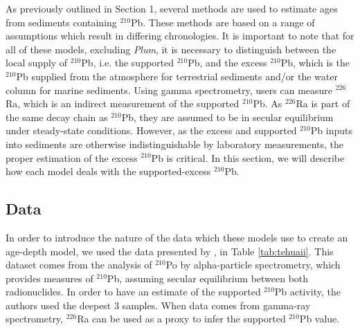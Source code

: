 \documentclass [10pt] {article}
\begin{document}
As previously outlined in Section 1, several methods are used to estimate ages from sediments containing $^{210}$Pb. 
These methods are based on a range of assumptions which result in differing chronologies. 
It is important to note that for all of these models, excluding \textit{Plum}, it is necessary to distinguish between the local supply of $^{210}$Pb, i.e. the supported $^{210}$Pb, and the excess $^{210}$Pb, which is the $^{210}$Pb supplied from the atmosphere for terrestrial sediments and/or the water column for marine sediments.
Using gamma spectrometry, users can measure $^{226}$Ra, which is an indirect measurement of the supported $^{210}$Pb. 
As $^{226}$Ra is part of the same decay chain as $^{210}$Pb, they are assumed to be in secular equilibrium under steady-state conditions. 
However, as the excess and supported $^{210}$Pb inputs into sediments are otherwise indistinguishable by laboratory measurements, the proper estimation of the excess $^{210}$Pb is critical.
In this section, we will describe how each model deals with the supported-excess $^{210}$Pb.

\subsection{Data}

	In order to introduce the nature of the data which these models use to create an age-depth model, we used the data presented by  \citet{Sanchez-Cabeza2012}, in Table \ref{tab:tehuaii}.
This dataset comes from the analysis of $^{210}$Po by alpha-particle spectrometry, which provides measures of $^{210}$Pb, assuming secular equilibrium between both radionuclides. In order to have an estimate of the supported $^{210}$Pb activity, the authors used the deepest 3 samples. When data comes from gamma-ray spectrometry, $^{226}$Ra can be used as a proxy to infer the supported $^{210}$Pb value.  
\end{document}
